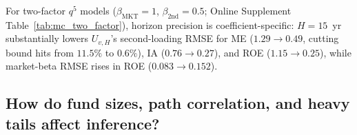 \documentclass[12pt]{article}
\begin{document}


For two-factor $q^5$ models ($\beta_{\mathrm{MKT}}=1$, $\beta_{\mathrm{2nd}}=0.5$; Online Supplement Table~\ref{tab:mc_two_factor}), horizon precision is coefficient-specific: $H = 15$~yr substantially lowers $U_{v,H}$'s second-loading RMSE for ME ($1.29 \to 0.49$, cutting bound hits from $11.5\%$ to $0.6\%$), IA ($0.76 \to 0.27$), and ROE ($1.15 \to 0.25$), while market-beta RMSE rises in ROE ($0.083 \to 0.152$).

\subsection{How do fund sizes, path correlation, and heavy tails affect inference?}
\label{sec:mc_hardening}
\end{document}

